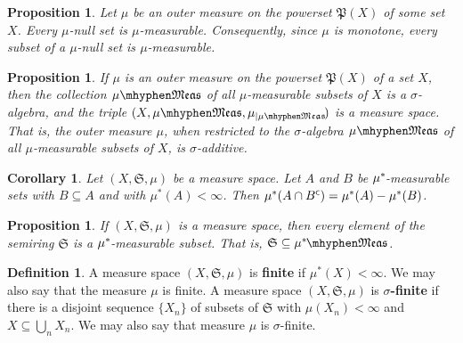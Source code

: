 \documentclass[
twoside=true,
paper=letter,
fontsize=11pt,
pagesize=auto,
leqno,
openany,
headsepline,
overfullrule,
]{scrbook}
\theoremstyle{plain}
\theoremstyle{plain}
\newtheorem{prop}[thm]{Proposition}
\newtheorem{cor}[thm]{Corollary}
\theoremstyle{definition}
\newtheorem{defn}[thm]{Definition}
\theoremstyle{bfnoteitalic}
\theoremstyle{bfnoteroman}
\newcommand{\sigalg}[1]{\mathfrak{#1}}
\newcommand{\textsigma}{\hbox{\large{$\sigma$}}\kern-1pt}
\newcommand{\restrictedto}[1]{_{\lvert#1}\kern-1.5pt}
\newcommand{\comp}{^{\hbox{\tiny{$\mathsf C$}}}}
\newcommand{\meets}{\cap}
\newcommand{\semiring}{\sigalg{S}}
\newcommand{\powerset}{\mathfrak{P}}
\newcommand{\measurable}[1]{{#1}\mhyphen\mathfrak{Meas}}
\newcommand{\kernast}{\ast\kern-1pt}
\newcommand{\measurespace}{X}
\newcommand{\measure}{\mu}
\begin{document}
\begin{prop}
Let $\measure$ be an outer measure on the powerset $\powerset(\measurespace)$ of some set $\measurespace$.
Every $\measure$\hyp{}null set is $\measure$\hyp{}measurable. 
Consequently, since $\measure$ is monotone,  every subset of a $\measure$\hyp{}null set is 
$\measure$\hyp{}measurable.
\end{prop}




\begin{prop}\label{restricted_outer_measure}
If $\measure$ is an outer measure on the powerset $\powerset(\measurespace)$ of a set $\measurespace$, then the collection $\measurable{\measure}$ of all $\measure$\hyp{}measurable subsets of $\measurespace$ is a \textsigma-algebra, and the triple $(\measurespace, \measurable{\measure}, \measure\restrictedto{\measurable{\measure}})$ is a measure space.  That is, the outer measure $\measure$, when restricted to the \textsigma-algebra $\measurable{\measure}$ of all $\measure$\hyp{}measurable subsets of $\measurespace$, is \textsigma-additive.
\end{prop}



\begin{cor}\label{subtractive}
Let $(\measurespace, \semiring, \measure)$ be a measure space. Let $A$ and $B$ be $\measure^\kernast$\hyp{}measurable sets with $B\subseteq A$ and with $\measure^*(A)< \infty$.
Then $\measure^*(A\meets B\comp) = \measure^*(A) - \measure^*(B)$.
\end{cor}




\begin{prop}\label{semiring_measurable}
If $(\measurespace, \semiring, \measure)$ is a measure space, then every element of the semiring 
$\semiring$ is a $\measure^\kernast$\hyp{}measurable subset. That is, 
$\semiring\subseteq \measurable{\measure^\kernast}$.
\end{prop}



\begin{defn}\label{sigma_finite}
A measure space $(\measurespace, \semiring, \measure)$ is 
\textbf{finite}
if $\measure^*(\measurespace) < \infty$. We may also say that the measure $\measure$ is finite.
A measure space $(\measurespace, \semiring, \measure)$ is 
\textbf{\textsigma-finite}
\index{sigma finite@$\textsigma$-finite}
if there is a disjoint sequence $\{ \measurespace_n \}$ of subsets of $\semiring$ with 
$\measure(\measurespace_n) < \infty$ 
and 
$\measurespace\subseteq\bigcup_n\measurespace_n$. 
We may also say that measure $\measure$ is \textsigma\hyp{}finite.
\end{defn}
\end{document}
